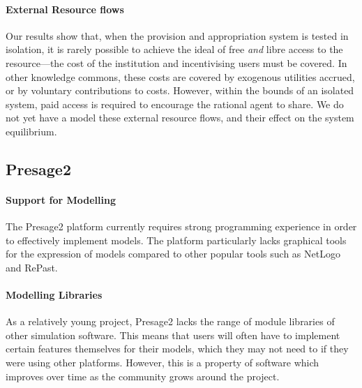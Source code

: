 \paragraph{External Resource flows}
Our results show that, when the provision and appropriation system is tested in
isolation, it is rarely possible to achieve the ideal of free \emph{and} libre
access to the resource---the cost of the institution and incentivising users
must be covered. In other knowledge commons, these costs are covered by
exogenous utilities accrued, or by voluntary contributions to costs. However,
within the bounds of an isolated system, paid access is required to encourage the
rational agent to share. We do not yet have a model these external resource
flows, and their effect on the system equilibrium.


\subsection{Presage2}

\paragraph{Support for Modelling} The Presage2 platform currently requires
strong programming experience in order to effectively implement models. The
platform particularly lacks graphical tools for the expression of models
compared to other popular tools such as NetLogo and RePast.

\paragraph{Modelling Libraries} As a relatively young project, Presage2 lacks
the range of module libraries of other simulation software. This means that
users will often have to implement certain features themselves for their
models, which they may not need to if they were using other platforms.
However, this is a property of software which improves over time as the community
grows around the project.


